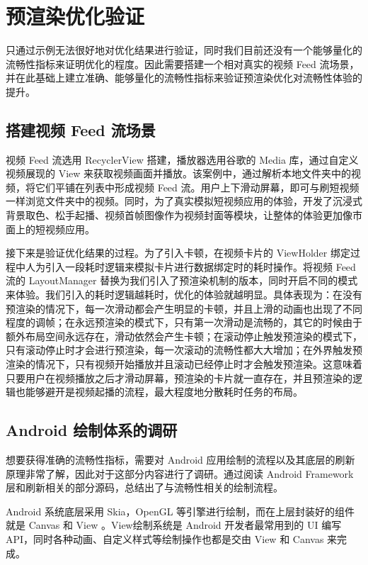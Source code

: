 \chapter{预渲染优化验证}

只通过示例无法很好地对优化结果进行验证，同时我们目前还没有一个能够量化的流畅性指标来证明优化的程度。因此需要搭建一个相对真实的视频 Feed 流场景，并在此基础上建立准确、能够量化的流畅性指标来验证预渲染优化对流畅性体验的提升。

\section{搭建视频 Feed 流场景}

视频 Feed 流选用 RecyclerView 搭建，播放器选用谷歌的 Media 库，通过自定义视频展现的 View 来获取视频画面并播放。该案例中，通过解析本地文件夹中的视频，将它们平铺在列表中形成视频 Feed 流。用户上下滑动屏幕，即可与刷短视频一样浏览文件夹中的视频。同时，为了真实模拟短视频应用的体验，开发了沉浸式背景取色、松手起播、视频首帧图像作为视频封面等模块，让整体的体验更加像市面上的短视频应用。

接下来是验证优化结果的过程。为了引入卡顿，在视频卡片的 ViewHolder 绑定过程中人为引入一段耗时逻辑来模拟卡片进行数据绑定时的耗时操作。将视频 Feed 流的 LayoutManager 替换为我们引入了预渲染机制的版本，同时开启不同的模式来体验。我们引入的耗时逻辑越耗时，优化的体验就越明显。具体表现为：在没有预渲染的情况下，每一次滑动都会产生明显的卡顿，并且上滑的动画也出现了不同程度的调帧；在永远预渲染的模式下，只有第一次滑动是流畅的，其它的时候由于额外布局空间永远存在，滑动依然会产生卡顿；在滚动停止触发预渲染的模式下，只有滚动停止时才会进行预渲染，每一次滚动的流畅性都大大增加；在外界触发预渲染的情况下，只有视频开始播放并且滚动已经停止时才会触发预渲染。这意味着只要用户在视频播放之后才滑动屏幕，预渲染的卡片就一直存在，并且预渲染的逻辑也能够避开是视频起播的流程，最大程度地分散耗时任务的布局。

\section{Android 绘制体系的调研}

想要获得准确的流畅性指标，需要对 Android 应用绘制的流程以及其底层的刷新原理非常了解，因此对于这部分内容进行了调研。通过阅读 Android Framework 层和刷新相关的部分源码，总结出了与流畅性相关的绘制流程。

Android 系统底层采用 Skia，OpenGL 等引擎进行绘制，而在上层封装好的组件就是 Canvas 和 View 。\cite{tahir2013learning}View绘制系统是 Android 开发者最常用到的 UI 编写 API，同时各种动画、自定义样式等绘制操作也都是交由 View 和 Canvas 来完成。

